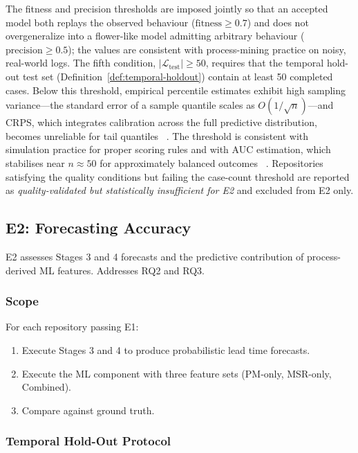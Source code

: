 The fitness and precision thresholds are imposed jointly so that an accepted
model both replays the observed behaviour ($\text{fitness} \geq 0.7$) and does
not overgeneralize into a flower-like model admitting arbitrary behaviour
($\text{precision} \geq 0.5$); the values are consistent with process-mining
practice on noisy, real-world logs. The fifth condition,
$|\mathcal{L}_{\text{test}}| \geq 50$, requires that the temporal hold-out
test set (Definition~\ref{def:temporal-holdout}) contain at least 50
completed cases. Below this threshold, empirical percentile estimates exhibit
high sampling variance---the standard error of a sample quantile scales as
$O(1/\sqrt{n})$---and CRPS, which integrates calibration across the full
predictive distribution, becomes unreliable for tail quantiles
~\cite{gneiting2007strictly}. The threshold is consistent with simulation
practice for proper scoring rules and with AUC estimation, which stabilises
near $n \approx 50$ for approximately balanced outcomes
~\cite{hanley1982meaning}. Repositories satisfying the quality conditions but
failing the case-count threshold are reported as
\emph{quality-validated but statistically insufficient for E2} and
excluded from E2 only.


\subsection{E2: Forecasting Accuracy}
\label{sec:e2-design}

E2 assesses Stages 3 and 4 forecasts and the predictive contribution of
process-derived ML features. Addresses RQ2 and RQ3.

\subsubsection{Scope}

For each repository passing E1:
\begin{enumerate}
    \item Execute Stages 3 and 4 to produce probabilistic lead time
    forecasts.
    \item Execute the ML component with three feature sets (PM-only,
    MSR-only, Combined).
    \item Compare against ground truth.
\end{enumerate}

\subsubsection{Temporal Hold-Out Protocol}
\label{sec:temporal-holdout}

